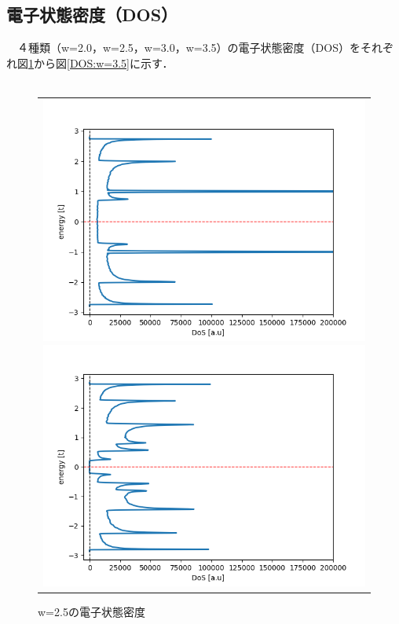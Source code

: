 \newpage
\subsection{電子状態密度（DOS）}
　４種類（w=2.0，w=2.5，w=3.0，w=3.5）の電子状態密度（DOS）をそれぞれ図\ref{DOS:w=2.0}から図\ref{DOS:w=3.5}に示す．\\
\\
\begin{figure}[htpb]
  \centering

  \begin{tabular}{c}
    \begin{minipage}{0.50\hsize}
    \centering
    \includegraphics[keepaspectratio, scale=0.55]{./data/w2/w2-dos.png}
    \caption{w=2.0の電子状態密度}
    \label{DOS:w=2.0}
    \end{minipage}

    \begin{minipage}{0.50\hsize}
    \centering
    \includegraphics[keepaspectratio, scale=0.55]{./data/w2_5/w2_5-dos.png}
    \caption{w=2.5の電子状態密度}
    \end{minipage}


\end{tabular}
\end{figure}
